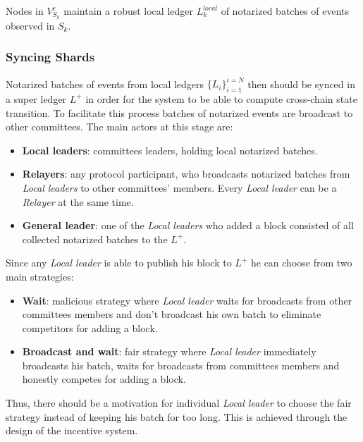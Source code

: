 Nodes in $V^{e}_{S_k}$ maintain a robust local ledger $L^{local}_k$ of notarized batches of events observed in $S_k$.

\subsubsection{Syncing Shards}

Notarized batches of events from local ledgers $\{L_i\}_{i=1}^{i=N}$ then should be synced in a super ledger $L^+$ in order for the system to be able to compute cross-chain state transition.
To facilitate this process batches of notarized events are broadcast to other committees.
The main actors at this stage are:
\begin{itemize}
    \item \textbf{Local leaders}: committees leaders, holding local notarized batches.
    \item \textbf{Relayers}: any protocol participant, who broadcasts notarized batches from \emph{Local leaders} to other committees' members.
    Every \emph{Local leader} can be a \emph{Relayer} at the same time.
    \item \textbf{General leader}: one of the \emph{Local leaders} who added a block consisted of all collected notarized batches to the $L^+$.
\end{itemize}

Since any \emph{Local leader} is able to publish his block to $L^+$ he can choose from two main strategies:
\begin{itemize}
    \item \textbf{Wait}: malicious strategy where \emph{Local leader} waits for broadcasts from other committees members and don't broadcast his own batch to eliminate competitors for adding a block.
    \item \textbf{Broadcast and wait}: fair strategy where \emph{Local leader} immediately broadcasts his batch, waits for broadcasts from committees members and honestly competes for adding a block.
\end{itemize}
Thus, there should be a motivation for individual \emph{Local leader} to choose the fair strategy instead of keeping his batch for too long.
This is achieved through the design of the incentive system.


